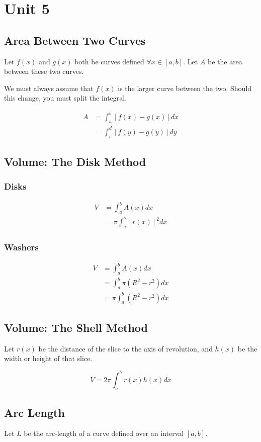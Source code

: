 \chapter{Unit 5}
\section{Area Between Two Curves}
Let $f(x)$ and $g(x)$ both be curves defined $\forall{x}\in[a,b]$. Let $A$ be
the area between these two curves.

We must always assume that $f(x)$ is the larger curve between the two. Should
this change, you must split the integral.

\begin{align}
  A &= \int_a^b [f(x)-g(x)] dx \\
    &= \int_c^d [f(y)-g(y)] dy
\end{align}

\section{Volume: The Disk Method}
\subsection{Disks}
\begin{align}
  V &= \int_a^b A(x) dx \\
    &= \pi\int_a^b [r(x)]^2 dx
\end{align}

\subsection{Washers}
\begin{align}
  V &= \int_a^b A(x) dx \\
    &= \int_a^b \pi(R^2-r^2) dx \\
    &= \pi\int_a^b (R^2-r^2) dx
\end{align}

\section{Volume: The Shell Method}
Let $r(x)$ be the distance of the slice to the axis of revolution, and $h(x)$ be
the width or height of that slice.

\begin{equation}
  V = 2\pi\int_a^b r(x)h(x) dx
\end{equation}

\section{Arc Length}
Let $L$ be the arc-length of a curve defined over an interval $[a,b]$.

